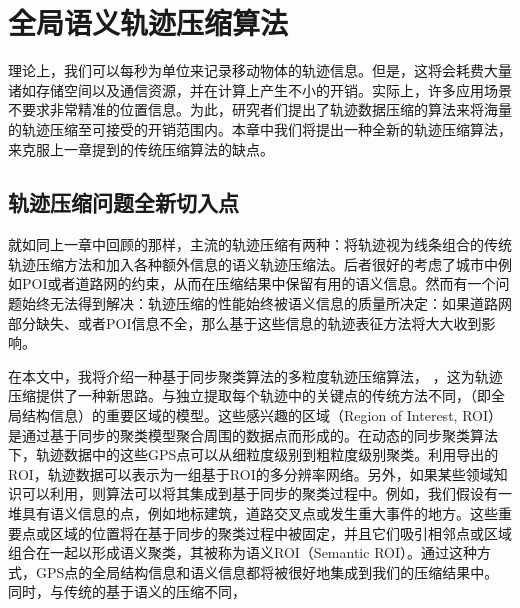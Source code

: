 
\chapter{全局语义轨迹压缩算法}
\label{chapter:main1}

理论上，我们可以每秒为单位来记录移动物体的轨迹信息。但是，这将会耗费大量诸如存储空间以及通信资源，并在计算上产生不小的开销。实际上，许多应用场景不要求非常精准的位置信息。为此，研究者们提出了轨迹数据压缩的算法来将海量的轨迹压缩至可接受的开销范围内。本章中我们将提出一种全新的轨迹压缩算法，来克服上一章提到的传统压缩算法的缺点。


\section{轨迹压缩问题全新切入点}
\label{sec:start}
就如同上一章中回顾的那样，主流的轨迹压缩有两种：将轨迹视为线条组合的传统轨迹压缩方法和加入各种额外信息的语义轨迹压缩法。后者很好的考虑了城市中例如POI或者道路网的约束，从而在压缩结果中保留有用的语义信息。然而有一个问题始终无法得到解决：轨迹压缩的性能始终被语义信息的质量所决定：如果道路网部分缺失、或者POI信息不全，那么基于这些信息的轨迹表征方法将大大收到影响。

在本文中，我将介绍一种基于同步聚类算法的多粒度轨迹压缩算法， \CascadeSync，这为轨迹压缩提供了一种新思路。与独立提取每个轨迹中的关键点的传统方法不同，（即全局结构信息）的重要区域的模型。这些感兴趣的区域（Region of Interest, ROI）是通过基于同步的聚类模型聚合周围的数据点而形成的。在动态的同步聚类算法下，轨迹数据中的这些GPS点可以从细粒度级别到粗粒度级别聚类。利用导出的ROI，轨迹数据可以表示为一组基于ROI的多分辨率网络。另外，如果某些领域知识可以利用，则算法可以将其集成到基于同步的聚类过程中。例如，我们假设有一堆具有语义信息的点，例如地标建筑，道路交叉点或发生重大事件的地方。这些重要点或区域的位置将在基于同步的聚类过程中被固定，并且它们吸引相邻点或区域组合在一起以形成语义聚类，其被称为语义ROI（Semantic ROI）。通过这种方式，GPS点的全局结构信息和语义信息都将被很好地集成到我们的压缩结果中。同时，与传统的基于语义的压缩不同，


